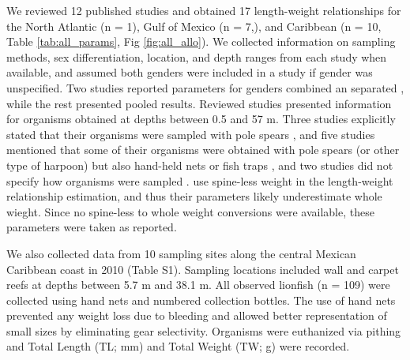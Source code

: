 \documentclass[fleqn,10pt,lineno]{wlpeerj} %
\begin{document}
We reviewed 12 published studies and obtained 17 length-weight
relationships for the North Atlantic (n = 1), Gulf of Mexico (n = 7,),
and Caribbean (n = 10, Table \ref{tab:all_params}, Fig
\ref{fig:all_allo}). We collected information on sampling methods, sex
differentiation, location, and depth ranges from each study when
available, and assumed both genders were included in a study if gender
was unspecified. Two studies reported parameters for genders combined an
separated \citep{aguilarperera_2016,fogg_2013}, while the rest presented
pooled results. Reviewed studies presented information for organisms
obtained at depths between 0.5 and 57 m. Three studies explicitly stated
that their organisms were sampled with pole spears
\citep{aguilarperera_2016,chin_2016,dahl_2014,sabidoitz_2016}, and five
studies mentioned that some of their organisms were obtained with pole
spears (or other type of harpoon) but also hand-held nets or fish traps
\citep{sandel_2015,barbour_2011,fogg_2013,edwards_2014,sabidoitza_2016,sabidoitz_2016,toledohernndez_2014},
and two studies did not specify how organisms were sampled
\citep{deleon_2013,darling_2011}. \citet{fogg_2013} use spine-less
weight in the length-weight relationship estimation, and thus their
parameters likely underestimate whole wieght. Since no spine-less to
whole weight conversions were available, these parameters were taken as
reported.

We also collected data from 10 sampling sites along the central Mexican
Caribbean coast in 2010 (Table S1). Sampling locations included wall and
carpet reefs at depths between 5.7 m and 38.1 m. All observed lionfish
(n = 109) were collected using hand nets and numbered collection
bottles. The use of hand nets prevented any weight loss due to bleeding
and allowed better representation of small sizes by eliminating gear
selectivity. Organisms were euthanized via pithing and Total Length (TL;
mm) and Total Weight (TW; g) were recorded.
\end{document}
